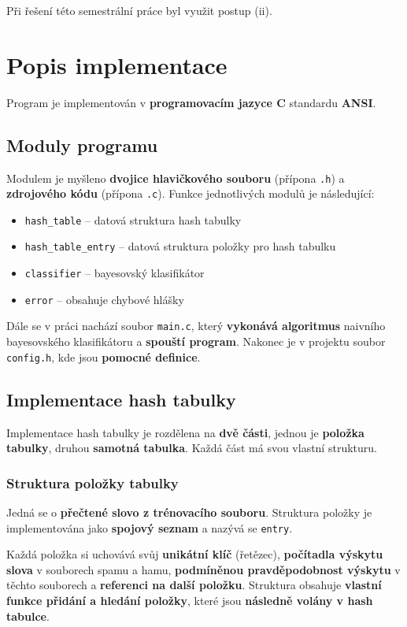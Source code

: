 \documentclass[12pt]{report}
\begin{document}
	Při řešení této semestrální práce byl využit postup (ii).
	
	\chapter{Popis implementace}
	Program je implementován v \textbf{programovacím jazyce C} standardu \textbf{ANSI}.
 	
 	\section{Moduly programu}
 	Modulem je myšleno \textbf{dvojice hlavičkového souboru} (přípona \texttt{.h}) a \textbf{zdrojového kódu} (přípona \texttt{.c}). Funkce jednotlivých modulů je následující:
 	
 	\begin{itemize}
 		\item \texttt{hash\_table} – datová struktura hash tabulky
 		\item \texttt{hash\_table\_entry} – datová struktura položky pro hash tabulku
 		\item \texttt{classifier} – bayesovský klasifikátor
 		\item \texttt{error} – obsahuje chybové hlášky
 	\end{itemize}
 
 	Dále se v práci nachází soubor \texttt{main.c}, který \textbf{vykonává algoritmus} naivního bayesovského klasifikátoru a \textbf{spouští program}. Nakonec je v projektu soubor \texttt{config.h}, kde jsou \textbf{pomocné definice}. 
 	
 	\section{Implementace hash tabulky}
    Implementace hash tabulky je rozdělena na \textbf{dvě části}, jednou je \textbf{položka tabulky}, druhou \textbf{samotná tabulka}. Každá část má svou vlastní strukturu.
 	
 	 	\subsection{Struktura položky tabulky}
 		Jedná se o \textbf{přečtené slovo z trénovacího souboru}. Struktura položky je implementována jako \textbf{spojový seznam} a nazývá se \texttt{entry}.
 		
 		Každá položka si uchovává svůj \textbf{unikátní klíč} (řetězec), \textbf{počítadla výskytu slova} v souborech spamu a hamu, \textbf{podmíněnou pravděpodobnost výskytu} v těchto souborech a \textbf{referenci na další položku}. Struktura obsahuje \textbf{vlastní funkce přidání a hledání položky}, které jsou \textbf{následně volány v hash tabulce}.
 		
\end{document}

